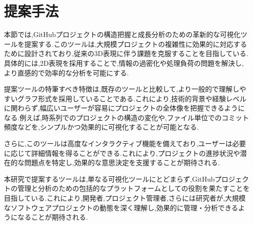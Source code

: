 \documentclass[12pt,twoside]{jbook}
\begin{document}
\chapter{提案手法}
本節では,GitHubプロジェクトの構造把握と成長分析のための革新的な可視化ツールを提案する.このツールは,大規模プロジェクトの複雑性に効果的に対応するために設計されており,従来の3D表現に伴う課題を克服することを目指している.具体的には,2D表現を採用することで,情報の過密化や処理負荷の問題を解決し,より直感的で効率的な分析を可能にする.

提案ツールの特筆すべき特徴は,既存のツールと比較して,より一般的で理解しやすいグラフ形式を採用していることである.これにより,技術的背景や経験レベルに関わらず,幅広いユーザーが容易にプロジェクトの全体像を把握できるようになる.例えば,時系列でのプロジェクトの構造の変化や,ファイル単位でのコミット頻度などを,シンプルかつ効果的に可視化することが可能となる.

さらに,このツールは高度なインタラクティブ機能を備えており,ユーザーは必要に応じて詳細情報を得ることができる.これにより,プロジェクトの進捗状況や潜在的な問題点を特定し,効果的な意思決定を支援することが期待される.

本研究で提案するツールは,単なる可視化ツールにとどまらず,GitHubプロジェクトの管理と分析のための包括的なプラットフォームとしての役割を果たすことを目指している.これにより,開発者,プロジェクト管理者,さらには研究者が,大規模なソフトウェアプロジェクトの動態を深く理解し,効果的に管理・分析できるようになることが期待される.
\end{document}
